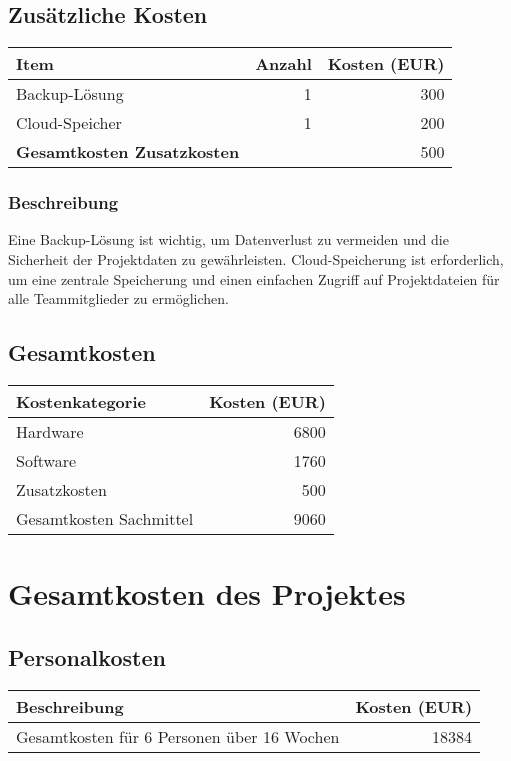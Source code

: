 \subsection*{Zusätzliche Kosten}
\begin{tabular}{lrr}
  \toprule
  \textbf{Item} & \textbf{Anzahl} & \textbf{Kosten (EUR)} \\
  \midrule
  Backup-Lösung & 1 & 300 \\
  Cloud-Speicher & 1 & 200 \\
  \midrule
  \textbf{Gesamtkosten Zusatzkosten} & & 500 \\
  \bottomrule
\end{tabular}

\subsubsection*{Beschreibung}
Eine Backup-Lösung ist wichtig, um Datenverlust zu vermeiden und die Sicherheit der Projektdaten zu gewährleisten. Cloud-Speicherung ist erforderlich, um eine zentrale Speicherung und einen einfachen Zugriff auf Projektdateien für alle Teammitglieder zu ermöglichen.

\subsection*{Gesamtkosten}
\begin{tabular}{lr}
  \toprule
  \textbf{Kostenkategorie} & \textbf{Kosten (EUR)} \\
  \midrule
  Hardware & 6800 \\
  Software & 1760 \\
  Zusatzkosten & 500 \\
  \midrule
  Gesamtkosten Sachmittel & 9060 \\
  \bottomrule
\end{tabular}

\section*{Gesamtkosten des Projektes}

\subsection*{Personalkosten}
\begin{tabular}{lr}
  \toprule
  \textbf{Beschreibung} & \textbf{Kosten (EUR)} \\
  \midrule
  Gesamtkosten für 6 Personen über 16 Wochen & 18384 \\
  \bottomrule
\end{tabular}

